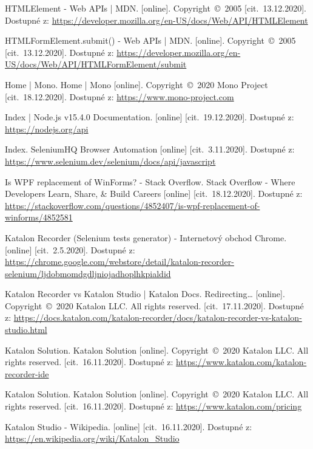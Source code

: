 \begin{thebibliography}{99}
 HTMLElement - Web APIs | MDN. [online]. Copyright~©~2005 [cit.~13.12.2020]. Dostupné z: \url{https://developer.mozilla.org/en-US/docs/Web/API/HTMLElement}

 HTMLFormElement.submit() - Web APIs | MDN. [online]. Copyright~©~2005 [cit.~13.12.2020]. Dostupné z: \url{https://developer.mozilla.org/en-US/docs/Web/API/HTMLFormElement/submit}

 Home | Mono. Home | Mono [online]. Copyright~©~2020 Mono Project [cit.~18.12.2020]. Dostupné z: \url{https://www.mono-project.com}

 Index | Node.js v15.4.0 Documentation. [online] [cit.~19.12.2020]. Dostupné z: \url{https://nodejs.org/api}

 Index. SeleniumHQ Browser Automation [online] [cit.~3.11.2020]. Dostupné z: \url{https://www.selenium.dev/selenium/docs/api/javascript}

 Is WPF replacement of WinForms? - Stack Overflow. Stack Overflow - Where Developers Learn, Share, \& Build Careers [online] [cit.~18.12.2020]. Dostupné z: \url{https://stackoverflow.com/questions/4852407/is-wpf-replacement-of-winforms/4852581}

 Katalon Recorder (Selenium tests generator) - Internetový obchod Chrome. [online] [cit.~2.5.2020]. Dostupné z: \url{https://chrome.google.com/webstore/detail/katalon-recorder-selenium/ljdobmomdgdljniojadhoplhkpialdid}

 Katalon Recorder vs Katalon Studio | Katalon Docs. Redirecting… [online]. Copyright~©~2020 Katalon LLC. All rights reserved. [cit.~17.11.2020]. Dostupné z: \url{https://docs.katalon.com/katalon-recorder/docs/katalon-recorder-vs-katalon-studio.html}

 Katalon Solution. Katalon Solution [online]. Copyright~©~2020 Katalon LLC. All rights reserved. [cit.~16.11.2020]. Dostupné z: \url{https://www.katalon.com/katalon-recorder-ide}

 Katalon Solution. Katalon Solution [online]. Copyright~©~2020 Katalon LLC. All rights reserved. [cit.~16.11.2020]. Dostupné z: \url{https://www.katalon.com/pricing}

 Katalon Studio - Wikipedia. [online] [cit.~16.11.2020]. Dostupné z: \url{https://en.wikipedia.org/wiki/Katalon_Studio}


\end{thebibliography}
